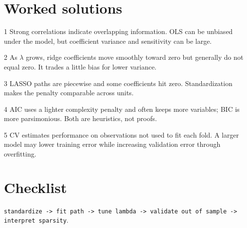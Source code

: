 \documentclass[11pt]{article}
\begin{document}
\section{Worked solutions}
\begin{answer}{1} Strong correlations indicate overlapping information. OLS can be unbiased under the model, but coefficient variance and sensitivity can be large.\end{answer}
\begin{answer}{2} As $\lambda$ grows, ridge coefficients move smoothly toward zero but generally do not equal zero. It trades a little bias for lower variance.\end{answer}
\begin{answer}{3} LASSO paths are piecewise and some coefficients hit zero. Standardization makes the penalty comparable across units.\end{answer}
\begin{answer}{4} AIC uses a lighter complexity penalty and often keeps more variables; BIC is more parsimonious. Both are heuristics, not proofs.\end{answer}
\begin{answer}{5} CV estimates performance on observations not used to fit each fold. A larger model may lower training error while increasing validation error through overfitting.\end{answer}
\section*{Checklist}\texttt{standardize -> fit path -> tune lambda -> validate out of sample -> interpret sparsity}.
\end{document}
